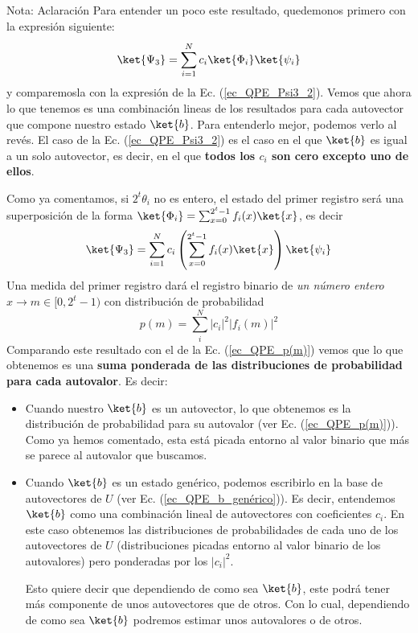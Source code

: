 \documentclass[a4paper,11pt]{book} %
\numberwithin{equation}{chapter}
\def\lp{\left(}
\def\rp{\right)}
\begin{document}
	\begin{mybox_blue}{Nota: Aclaración}	
	Para entender un poco este resultado, quedemonos primero con la expresión siguiente:
	\begin{equation} \label{ec_QPE_Psi_3_ci}
	\ket{\Psi_3}  = \sum_{i=1}^N  c_i \ket{\Phi_i}\ket{\psi_i} \\ \rule{0mm}{7mm}
	\end{equation}
	y comparemosla con la expresión de la Ec. (\ref{ec_QPE_Psi3_2}). Vemos que ahora lo que tenemos es una combinación lineas de los resultados para cada autovector que compone nuestro estado $\ket{b}$. Para entenderlo mejor, podemos verlo al revés. El caso de la Ec. (\ref{ec_QPE_Psi3_2}) es el caso en el que $\ket{b}$ es igual a un solo autovector, es decir, en el que \textbf{todos los $c_i$ son cero excepto uno de ellos}. 
	\end{mybox_blue}


Como ya comentamos, si $2^t \theta_i$ no es entero, el estado del primer registro será una superposición de la forma $\ket{\Phi_i} = \sum_{x=0}^{2^t-1} f_i(x) \ket{x}$, es decir
	\begin{equation} \label{ec_QPE_Psi_3_ci}
	\ket{\Psi_3}  = \sum_{i=1}^N  c_i \lp \sum_{x=0}^{2^t-1} f_i(x) \ket{x} \rp  \ket{\psi_i} \\ \rule{0mm}{7mm}
	\end{equation}
Una medida del primer registro dará el registro binario de \textit{un número entero} $x \to m \in [0,2^t-1)$ con distribución de probabilidad 
	\begin{equation} \label{ec_QPE_p(m)_ci}
	p(m) = \sum_i^N |c_i|^2 |f_i(m)|^2
	\end{equation}		
Comparando este resultado con el de la Ec. (\ref{ec_QPE_p(m)}) vemos que lo que obtenemos es una \textbf{suma ponderada de las distribuciones de probabilidad para cada autovalor}. Es decir:
\begin{itemize}
	\item Cuando nuestro $\ket{b}$ es un autovector, lo que obtenemos es la distribución de probabilidad para su autovalor (ver Ec. (\ref{ec_QPE_p(m)})). Como ya hemos comentado, esta está picada entorno al valor binario que más se parece al autovalor que buscamos.
	
	\item Cuando $\ket{b}$ es un estado genérico, podemos escribirlo en la base de autovectores de $U$ (ver Ec. (\ref{ec_QPE_b_genérico})). Es decir, entendemos $\ket{b}$ como una combinación lineal de autovectores con coeficientes $c_i$. En este caso obtenemos las distribuciones de probabilidades de cada uno de los autovectores de $U$ (distribuciones picadas entorno al valor binario de los autovalores) pero ponderadas por los $|c_i|^2$. 
	
	Esto quiere decir que dependiendo de como sea $\ket{b}$, este podrá tener más componente de unos autovectores que de otros. Con lo cual, dependiendo de como sea $\ket{b}$ podremos estimar unos autovalores o de otros.
\end{itemize}
\end{document}
